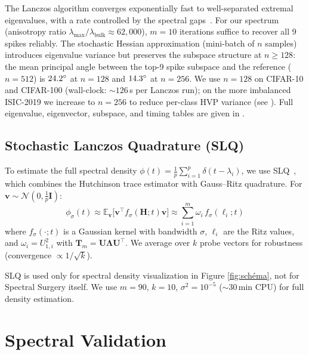 \documentclass[11pt,a4paper]{article}
\newcommand{\E}{\mathbb{E}}
\newcommand{\mat}[1]{\bm{#1}}
\newcommand{\vect}[1]{\bm{#1}}
\newcommand{\Hess}{\mat{H}}
\begin{document}
The Lanczos algorithm converges exponentially fast to well-separated
extremal eigenvalues, with a rate controlled by the spectral
gaps~\cite{saad1980}. For our spectrum (anisotropy ratio
$\lambda_{\max}/\lambda_{\mathrm{bulk}} \approx 62{,}000$), $m = 10$
iterations suffice to recover all 9 spikes reliably. The stochastic
Hessian approximation (mini-batch of $n$ samples) introduces
eigenvalue variance but preserves the subspace structure at $n \geq
128$: the mean principal angle between the top-9 spike subspace and
the reference ($n{=}512$) is $24.2\degree$ at $n{=}128$ and
$14.3\degree$ at $n{=}256$. We use $n{=}128$ on CIFAR-10 and CIFAR-100
(wall-clock: ${\sim}126$\,s per Lanczos run); on the more imbalanced
ISIC-2019 we increase to $n{=}256$ to reduce per-class HVP variance
(see ). Full eigenvalue, eigenvector, subspace,
and timing tables are given in .

\subsection{Stochastic Lanczos Quadrature (SLQ)}
\label{sec:slq}

To estimate the full spectral density
$\phi(t) = \frac{1}{p} \sum_{i=1}^{p} \delta(t - \lambda_i)$, we use
SLQ~\cite{ghorbani2019}, which combines the Hutchinson trace estimator
with Gauss--Ritz quadrature. For $\vect{v} \sim \mathcal{N}(0,
\frac{1}{p}\mat{I})$:
\begin{equation}
\phi_\sigma(t) \approx \E_{\vect{v}}\bigl[
  \vect{v}^\top f_\sigma(\Hess; t) \vect{v}
\bigr]
\approx \sum_{i=1}^{m} \omega_i \, f_\sigma(\ell_i; t)
\end{equation}
where $f_\sigma(\cdot; t)$ is a Gaussian kernel with bandwidth
$\sigma$, $\ell_i$ are the Ritz values, and
$\omega_i = U_{1,i}^2$ with $\mat{T}_m = \mat{U}\mat{\Lambda}\mat{U}^\top$.
We average over $k$ probe vectors for robustness (convergence
$\propto 1/\sqrt{k}$).

SLQ is used only for spectral density visualization in Figure \ref{fig:schéma}, not for Spectral
Surgery itself. We use $m=90$, $k=10$, $\sigma^2 = 10^{-5}$
(${\sim}30$\,min CPU) for full density estimation. 

\section{Spectral Validation}
\label{sec:validation}
\end{document}
